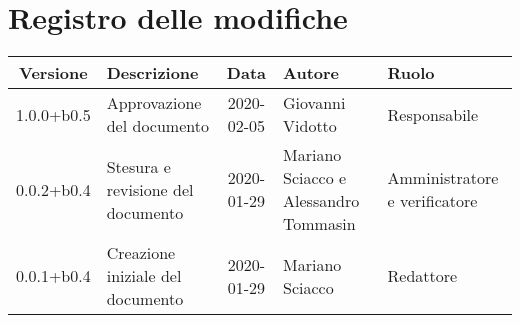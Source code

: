 \section*{Registro delle modifiche}

\begin{center}
	\begin{longtable}{|c|p{3.5cm}|c|p{3cm}|p{3cm}|}
	\hline
	\rowcolor{lighter-grayer}
	\textbf{Versione} & \textbf{Descrizione} & \textbf{Data} & \textbf{Autore} & \textbf{Ruolo} \\
	\hline
	\endfirsthead

	1.0.0+b0.5 & Approvazione del documento & 2020-02-05 & Giovanni Vidotto & Responsabile \\
	\hline
	0.0.2+b0.4 & Stesura e revisione del documento & 2020-01-29 & Mariano Sciacco e Alessandro Tommasin & Amministratore e verificatore \\
	\hline
	0.0.1+b0.4 & Creazione iniziale del documento & 2020-01-29 & Mariano Sciacco & Redattore \\
	\hline

	\end{longtable}
\end{center}